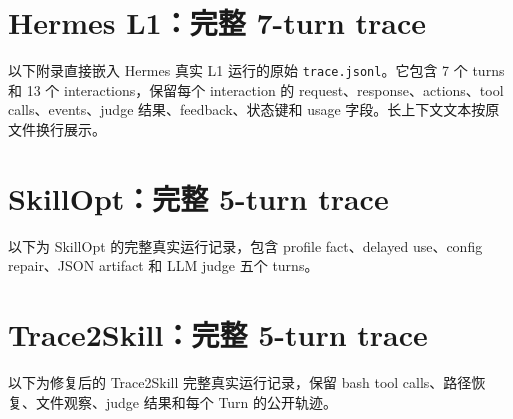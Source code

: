 \documentclass[11pt,a4paper]{article}
\newcommand{\code}[1]{\texttt{#1}}
\begin{document}
\clearpage
\appendix
\section{Hermes L1：完整 7-turn trace}

以下附录直接嵌入 Hermes 真实 L1 运行的原始 \code{trace.jsonl}。它包含 7 个 turns 和 13 个 interactions，保留每个 interaction 的 request、response、actions、tool calls、events、judge 结果、feedback、状态键和 usage 字段。长上下文文本按原文件换行展示。



\clearpage
\section{SkillOpt：完整 5-turn trace}

以下为 SkillOpt 的完整真实运行记录，包含 profile fact、delayed use、config repair、JSON artifact 和 LLM judge 五个 turns。



\clearpage
\section{Trace2Skill：完整 5-turn trace}

以下为修复后的 Trace2Skill 完整真实运行记录，保留 bash tool calls、路径恢复、文件观察、judge 结果和每个 Turn 的公开轨迹。


\end{document}
